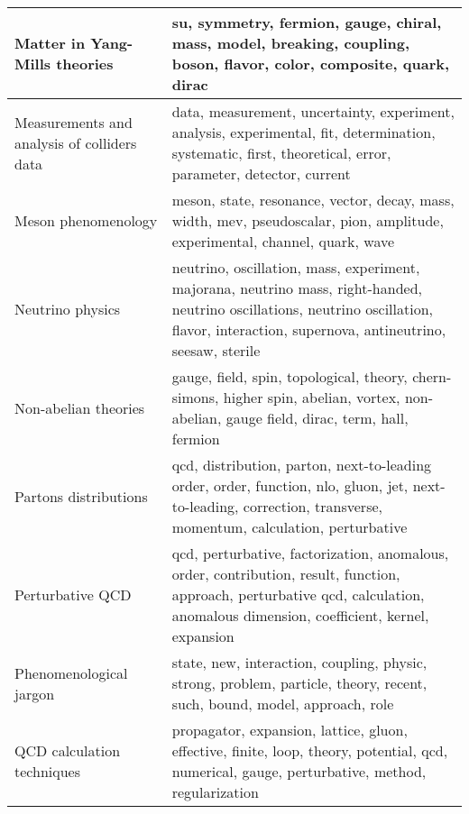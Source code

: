 \begin{longtable}[H]{p{}|p{}}
Matter in Yang-Mills theories                         &                                                                                       su, symmetry, fermion, gauge, chiral, mass, model, breaking, coupling, boson, flavor, color, composite, quark, dirac \\ \midrule
Measurements and analysis of colliders data           &                                                data, measurement, uncertainty, experiment, analysis, experimental, fit, determination, systematic, first, theoretical, error, parameter, detector, current \\ \midrule
Meson phenomenology                                   &                                                                                meson, state, resonance, vector, decay, mass, width, mev, pseudoscalar, pion, amplitude, experimental, channel, quark, wave \\ \midrule
Neutrino physics                                      &                 neutrino, oscillation, mass, experiment, majorana, neutrino mass, right-handed, neutrino oscillations, neutrino oscillation, flavor, interaction, supernova, antineutrino, seesaw, sterile \\ \midrule
Non-abelian theories                                  &                                                                  gauge, field, spin, topological, theory, chern-simons, higher spin, abelian, vortex, non-abelian, gauge field, dirac, term, hall, fermion \\ \midrule
Partons distributions                                 &                                           qcd, distribution, parton, next-to-leading order, order, function, nlo, gluon, jet, next-to-leading, correction, transverse, momentum, calculation, perturbative \\ \midrule
Perturbative QCD                                      &                           qcd, perturbative, factorization, anomalous, order, contribution, result, function, approach, perturbative qcd, calculation, anomalous dimension, coefficient, kernel, expansion \\ \midrule
Phenomenological jargon                               &                                                                                   state, new, interaction, coupling, physic, strong, problem, particle, theory, recent, such, bound, model, approach, role \\ \midrule
QCD calculation techniques                            &                                                             propagator, expansion, lattice, gluon, effective, finite, loop, theory, potential, qcd, numerical, gauge, perturbative, method, regularization \\ \midrule

\end{longtable}
